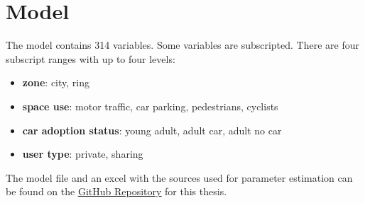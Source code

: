 \chapter{Model}
\label{app:model}
\sloppy
The model contains 314 variables. Some variables are subscripted. There are four subscript ranges with up to four levels:
        \begin{itemize}
            \item \textbf{zone}: city, ring
            \item \textbf{space use}: motor traffic, car parking, pedestrians, cyclists
            \item \textbf{car adoption status}: young adult, adult car, adult no car
            \item \textbf{user type}: private, sharing
        \end{itemize}The model file and an excel with the sources used for parameter estimation can be found on 
    the \underline{\textcolor{blue}{\href{https://github.com/Michared/roadspace-reallocation}{GitHub Repository}}} for this thesis.
